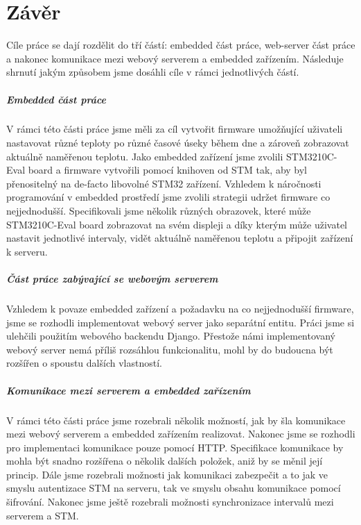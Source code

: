 \chapter*{Závěr}

Cíle práce se dají rozdělit do tří částí: embedded část práce, web-server část práce a nakonec
komunikace mezi webový serverem a embedded zařízením.
Následuje shrnutí jakým způsobem jsme dosáhli cíle v rámci jednotlivých částí.

\paragraph{Embedded část práce}
V rámci této části práce jsme měli za cíl vytvořit firmware umožňující uživateli nastavovat
různé teploty po různé časové úseky během dne a zároveň zobrazovat aktuálně naměřenou teplotu.
Jako embedded zařízení jsme zvolili STM3210C-Eval board a firmware vytvořili pomocí knihoven
od STM tak, aby byl přenositelný na de-facto libovolné STM32 zařízení.
Vzhledem k náročnosti programování v embedded prostředí jsme zvolili strategii udržet firmware
co nejjednodušší.
Specifikovali jsme několik různých obrazovek, které může STM3210C-Eval board zobrazovat na svém
displeji a díky kterým může uživatel nastavit jednotlivé intervaly, vidět aktuálně naměřenou teplotu a
připojit zařízení k serveru.

\paragraph{Část práce zabývající se webovým serverem}
Vzhledem k povaze embedded zařízení a požadavku na co nejjednodušší firmware, jsme se rozhodli
implementovat webový server jako separátní entitu.
Práci jsme si ulehčili použitím webového backendu Django.
Přestože námi implementovaný webový server nemá příliš rozsáhlou funkcionalitu, mohl by do budoucna
být rozšířen o spoustu dalších vlastností.

\paragraph{Komunikace mezi serverem a embedded zařízením}
V rámci této části práce jsme rozebrali několik možností, jak by šla komunikace mezi webový serverem
a embedded zařízením realizovat.
Nakonec jsme se rozhodli pro implementaci komunikace pouze pomocí HTTP.
Specifikace komunikace by mohla být snadno rozšířena o několik dalších položek, aniž by se měnil její
princip.
Dále jsme rozebrali možnosti jak komunikaci zabezpečit a to jak ve smyslu autentizace STM na serveru,
tak ve smyslu  obsahu komunikace pomocí šifrování.
Nakonec jsme ještě rozebrali možnosti synchronizace intervalů mezi serverem a STM.


